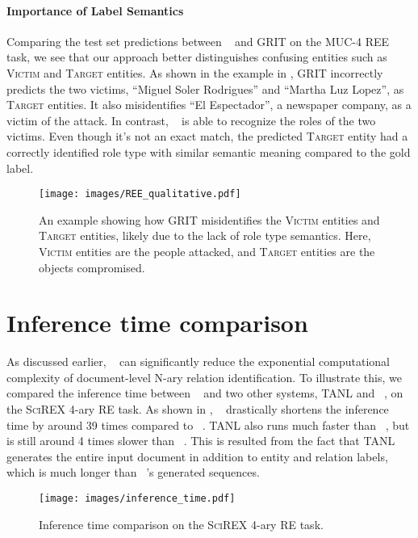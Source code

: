 \documentclass[11pt]{article}
\begin{document}
\paragraph{Importance of Label Semantics} Comparing the test set predictions between \modelshort~ and GRIT on the MUC-4 REE task, we see that our approach better distinguishes confusing entities such as \textsc{Victim} and \textsc{Target} entities. As shown in the example in , GRIT incorrectly predicts the two victims, ``Miguel Soler Rodrigues'' and ``Martha Luz Lopez'', as \textsc{Target} entities. It also misidentifies ``El Espectador'', a newspaper company, as a victim of the attack. In contrast, \modelshort~ is able to recognize the roles of the two victims. Even though it's not an exact match, the predicted \textsc{Target} entity had a correctly identified role type with similar semantic meaning compared to the gold label.

\begin{figure}[t]
    \centering
    \texttt{[image: images/REE\_qualitative.pdf]}
    \caption{An example showing how GRIT  misidentifies the \textsc{Victim} entities and \textsc{Target} entities, likely due to the lack of role type semantics. Here, \textsc{Victim} entities are the people attacked, and \textsc{Target} entities are the objects compromised.}
    \vspace{-4mm}
    \label{fig:ree_qualitative}
\end{figure}

\section{Inference time comparison}
As discussed earlier, \modelshort~ can significantly reduce the exponential computational complexity of document-level N-ary relation identification. To illustrate this, we compared the inference time between \modelshort~ and two other systems, TANL and \scirexpipeline~, on the \textsc{SciREX} 4-ary RE task. As shown in , \modelshort~ drastically shortens the inference time by around 39 times compared to \scirexpipeline~. TANL also runs much faster than \scirexpipeline~, but is still around 4 times slower than \modelshort~. This is resulted from the fact that TANL generates the entire input document in addition to entity and relation labels, which is much longer than \modelshort~'s generated sequences.

\begin{figure}[t]
    \centering
    \texttt{[image: images/inference\_time.pdf]}
    \caption{Inference time comparison on the \textsc{SciREX} 4-ary RE task.}
    \vspace{-4mm}
    \label{fig:inference_time}
\end{figure}
\end{document}
